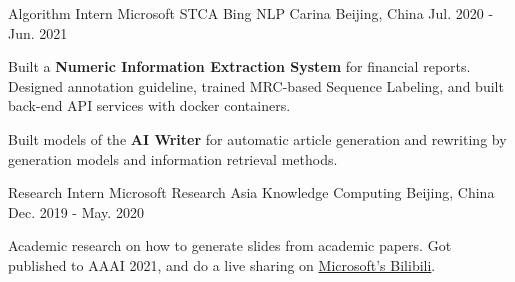 \begin{cventries}
  \cventry
    {Algorithm Intern} %
    {Microsoft STCA Bing NLP Carina} %
    {Beijing, China} %
    {Jul. 2020 - Jun. 2021} %
    {
      \begin{cvitems} %
        \item {Built a \textbf{Numeric Information Extraction System} for financial reports. Designed annotation guideline, trained MRC-based Sequence Labeling, and built back-end API services with docker containers.}
        \item {Built models of the \textbf{AI Writer} for automatic article generation and rewriting by generation models and information retrieval methods.}
      \end{cvitems}
    }

  \cventry
    {Research Intern} %
    {Microsoft Research Asia Knowledge Computing} %
    {Beijing, China} %
    {Dec. 2019 - May. 2020} %
    {
      \begin{cvitems} %
        \item {Academic research on how to generate slides from academic papers. Got published to AAAI 2021, and do a live sharing on \href{https://www.bilibili.com/video/BV1fV411q7Ho/}{Microsoft's Bilibili}.}
      \end{cvitems}
    }

\end{cventries}
